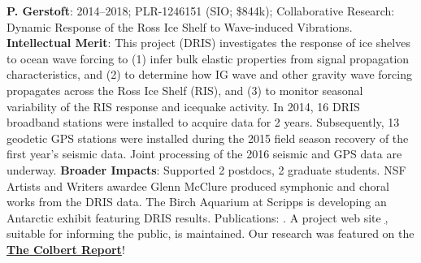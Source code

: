 {\bf  P. Gerstoft}: 2014--2018; PLR-1246151 (SIO; \$844k); Collaborative Research: Dynamic Response of the Ross Ice Shelf to Wave-induced Vibrations. {\bf Intellectual Merit}: This project (DRIS) investigates the response of ice shelves to ocean wave forcing to (1) infer bulk elastic properties from signal propagation characteristics, and (2) to determine how IG wave and other gravity wave forcing propagates across the Ross Ice Shelf (RIS), and (3) to monitor seasonal variability of the RIS response and icequake activity. In 2014, 16 DRIS broadband stations were installed to acquire data for 2 years. Subsequently, 13 geodetic GPS stations were installed during the 2015 field season recovery of the first year’s seismic data. Joint processing of the 2016 seismic and GPS data are underway. {\bf Broader Impacts}: Supported 2 postdocs, 2 graduate students. NSF Artists and Writers awardee Glenn McClure produced symphonic and choral works from the DRIS data. The Birch Aquarium at Scripps is developing an Antarctic exhibit featuring DRIS results. Publications: \cite{bromirski2015,diez2016,bromirski2017,chen2018,shen2018,chaput2018,white2019}. 
A project web site \href{https://scripps.ucsd.edu/centers/iceshelfvibes/}, suitable for informing the public, is maintained. 
Our research was featured on the %
\href{https://www.youtube.com/watch?v=djesneud0Yg&fbclid=IwAR1zgpupmvZv2lFUy2ce2bLAgpIvi0M7OBW7P0koa0VwpwfMg5-8Pyg9hwE&app=desktop}{\bf The Colbert Report}!


